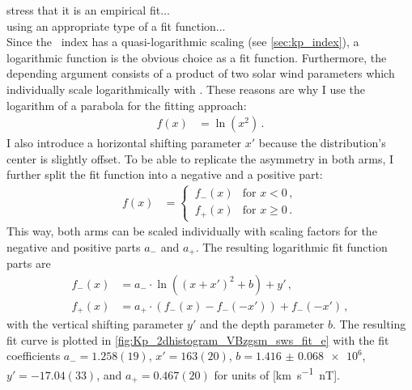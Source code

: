 
stress that it is an empirical fit...\\
using an appropriate type of a fit function...\\

Since the \Kp~index has a quasi-logarithmic scaling (see \autoref{sec:kp_index}), a logarithmic function is the obvious choice as a fit function. Furthermore, the depending argument consists of a product of two solar wind parameters which individually scale logarithmically with \Kp{}. These reasons are why I use the logarithm of a parabola for the fitting approach:
\begin{align}
	f(x) &= \ln\left(x^2\right)	\,.	\label{eq:log_square_function}
\end{align}
I also introduce a horizontal shifting parameter $x'$ because the distribution's center is slightly offset. To be able to replicate the asymmetry in both arms, I further split the fit function into a negative and a positive part:
\begin{align}
	f(x) &=
	\begin{cases}
		\,f_-(x) &\text{for } x < 0	\,,\\
		\,f_+(x) &\text{for } x \ge 0	\,.
	\end{cases}	\label{eq:log_square_fit_function}
\end{align}
This way, both arms can be scaled individually with scaling factors for the negative and positive parts $a_-$ and $a_+$. The resulting logarithmic fit function parts are
\begin{align}
	f_-(x) &= a_- \cdot \ln\left(\left(x + x'\right)^2 + b\right) + y'	\,,\\
	f_+(x) &= a_+ \cdot \left(f_-(x) - f_-\left(-x'\right)\right) + f_-\left(-x'\right)	\,,
\end{align}
with the vertical shifting parameter $y'$ and the depth parameter $b$. The resulting fit curve is plotted in \autoref{fig:Kp_2dhistogram_VBzgsm_sws_fit_e} with the fit coefficients $a_- = 1.258(19)$, $x' = 163(20)$, $b = \num{1.416(68)e6}$, $y' = -17.04(33)$, and $a_+ = 0.467(20)$ for units of [\si{\km\per\s \nano\tesla}].
